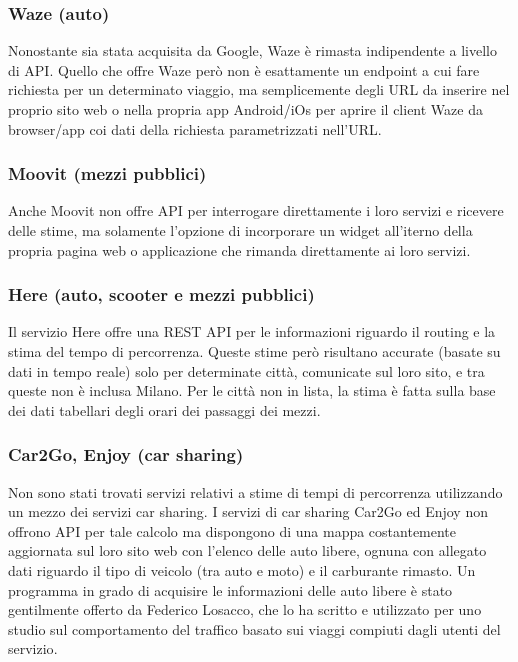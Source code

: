 \subsubsection{Waze (auto)}

Nonostante sia stata acquisita da Google, Waze è rimasta indipendente a livello di API. Quello che offre Waze però non è esattamente un endpoint a cui fare richiesta per un determinato viaggio, ma semplicemente degli URL da inserire nel proprio sito web o nella propria app Android/iOs per aprire il client Waze da browser/app coi dati della richiesta parametrizzati nell'URL\cite{wazeapi}.

\subsubsection{Moovit (mezzi pubblici)}

Anche Moovit non offre API per interrogare direttamente i loro servizi e ricevere delle stime, ma solamente l'opzione di incorporare un widget all'iterno della propria pagina web o applicazione che rimanda direttamente ai loro servizi\cite{moovitapi}.

\subsubsection{Here (auto, scooter e mezzi pubblici)}

Il servizio Here offre una REST API per le informazioni riguardo il routing e la stima del tempo di percorrenza. Queste stime però risultano accurate (basate su dati in tempo reale) solo per determinate città, comunicate sul loro sito, e tra queste non è inclusa Milano. Per le città non in lista, la stima è fatta sulla base dei dati tabellari degli orari dei passaggi dei mezzi\cite{hereapi}.

\subsubsection{Car2Go, Enjoy (car sharing)}

Non sono stati trovati servizi relativi a stime di tempi di percorrenza utilizzando un mezzo dei servizi car sharing. I servizi di car sharing Car2Go ed Enjoy non offrono API per tale calcolo ma dispongono di una mappa costantemente aggiornata sul loro sito web con l'elenco delle auto libere, ognuna con allegato dati riguardo il tipo di veicolo (tra auto e moto) e il carburante rimasto. Un programma in grado di acquisire le informazioni delle auto libere è stato gentilmente offerto da Federico Losacco, che lo ha scritto e utilizzato per uno studio sul comportamento del traffico basato sui viaggi compiuti dagli utenti del servizio\cite{losaccofederico}.

